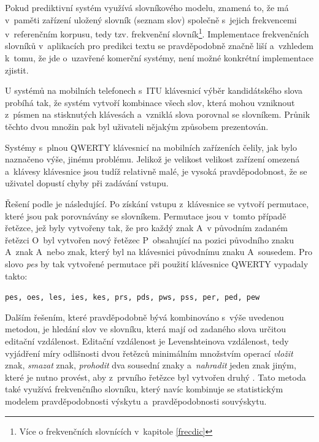 \documentclass[a4paper,11pt,openany]{book} %
\begin{document}
Pokud prediktivní systém využívá slovníkového modelu, znamená to, že má v~paměti zařízení uložený slovník (seznam slov) společně s~jejich frekvencemi v~referenčním korpusu, tedy tzv. frekvenční slovník\footnote{Více o frekvenčních slovnících v~kapitole \ref{frecdic}}. %
Implementace frekvenčních slovníků v~aplikacích pro predikci textu se pravděpodobně značně liší a~vzhledem k~tomu, že jde o~uzavřené komerční systémy, není možné konkrétní implementace zjistit. \parencite{alanhenry2014}

U systémů na mobilních telefonech s~ITU klávesnicí výběr kandidátského slova probíhá tak, že systém vytvoří kombinace všech slov, která mohou vzniknout z~písmen na stisknutých klávesách a~vzniklá slova porovnal se slovníkem. Průnik těchto dvou množin pak byl uživateli nějakým způsobem prezentován. 

Systémy s~plnou QWERTY klávesnicí na mobilních zařízeních čelily, jak bylo naznačeno výše, jinému problému. Jelikož je velikost velikost zařízení omezená a~klávesy klávesnice jsou tudíž relativně malé, je vysoká pravděpodobnost, že se uživatel dopustí chyby při zadávání vstupu. \parencite{kocienda2012method} %

Řešení podle \parencite{kocienda2012method} je následující. Po získání vstupu z~klávesnice se vytvoří permutace, které jsou pak porovnávány se slovníkem. Permutace jsou v~tomto případě řetězce, jež byly vytvořeny tak, že pro každý znak A~v původním zadaném řetězci O~byl vytvořen nový řetězec P~obsahující na pozici původního znaku A~znak A~nebo znak, který byl na klávesnici původnímu znaku A~sousedem. Pro slovo {\it pes} by tak vytvořené permutace při použití klávesnice QWERTY vypadaly takto: %

{\tt pes, oes, les, ies, kes, prs, pds, pws, pss, per, ped, pew}

Dalším řešením, které pravděpodobně bývá kombinováno s~výše uvedenou metodou, je hledání slov ve slovníku, která mají od zadaného slova určitou editační vzdálenost. Editační vzdálenost je Levenshteinova vzdálenost, tedy vyjádření míry odlišnosti dvou řetězců minimálním množstvím operací {\it vložit} znak, {\it smazat} znak, {\it prohodit} dva sousední znaky a~{\it nahradit} jeden znak jiným, které je nutno provést, aby z~prvního řetězce byl vytvořen druhý \parencite{levenshtein-en1966}. \nocite{levenshtein1965}  %
Tato metoda také využívá frekvenčního slovníku, který navíc kombinuje se statistickým modelem pravděpodobnosti výskytu a~pravděpodobnosti souvýskytu. \parencite{peternorvig} %
\end{document}
